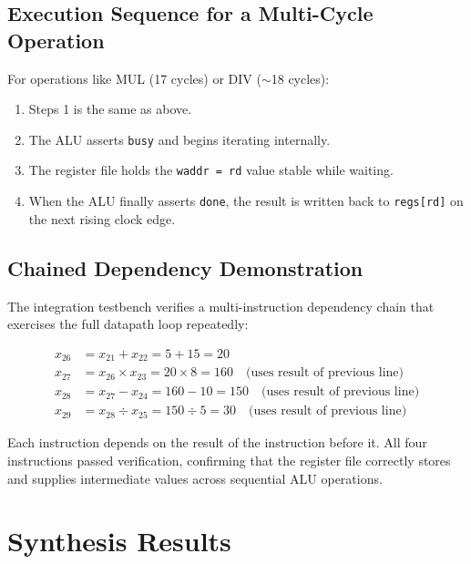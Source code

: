 \documentclass[12pt,a4paper]{article}
\begin{document}
\subsection{Execution Sequence for a Multi-Cycle Operation}

For operations like MUL (17 cycles) or DIV ($\sim$18 cycles):

\begin{enumerate}
    \item Steps 1 is the same as above.
    \item The ALU asserts \texttt{busy} and begins iterating internally.
    \item The register file holds the \texttt{waddr = rd} value stable while waiting.
    \item When the ALU finally asserts \texttt{done}, the result is written back to \texttt{regs[rd]} on the next rising clock edge.
\end{enumerate}

\subsection{Chained Dependency Demonstration}

The integration testbench verifies a multi-instruction dependency chain that exercises the full datapath loop repeatedly:

\begin{align*}
    x_{26} &= x_{21} + x_{22} = 5 + 15 = 20 \\
    x_{27} &= x_{26} \times x_{23} = 20 \times 8 = 160 \quad \text{(uses result of previous line)} \\
    x_{28} &= x_{27} - x_{24} = 160 - 10 = 150 \quad \text{(uses result of previous line)} \\
    x_{29} &= x_{28} \div x_{25} = 150 \div 5 = 30 \quad \text{(uses result of previous line)}
\end{align*}

Each instruction depends on the result of the instruction before it. All four instructions passed verification, confirming that the register file correctly stores and supplies intermediate values across sequential ALU operations.

\section{Synthesis Results}
\end{document}
